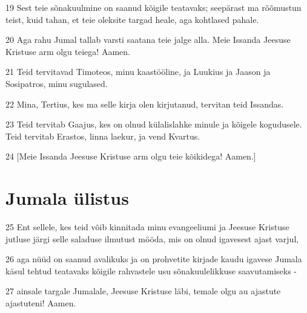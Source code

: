 \par 19 Sest teie sõnakuulmine on saanud kõigile teatavaks; seepärast ma rõõmustun teist, kuid tahan, et teie oleksite targad heale, aga kohtlased pahale.
\par 20 Aga rahu Jumal tallab varsti saatana teie jalge alla. Meie Issanda Jeesuse Kristuse arm olgu teiega! Aamen.
\par 21 Teid tervitavad Timoteos, minu kaastööline, ja Luukius ja Jaason ja Sosipatros, minu sugulased.
\par 22 Mina, Tertius, kes ma selle kirja olen kirjutanud, tervitan teid Issandas.
\par 23 Teid tervitab Gaajus, kes on olnud külalislahke minule ja kõigele kogudusele. Teid tervitab Erastos, linna laekur, ja vend Kvartus.
\par 24 [Meie Issanda Jeesuse Kristuse arm olgu teie kõikidega! Aamen.]

\section*{Jumala ülistus}

\par 25 Ent sellele, kes teid võib kinnitada minu evangeeliumi ja Jeesuse Kristuse jutluse järgi selle saladuse ilmutust mööda, mis on olnud igavesest ajast varjul,
\par 26 aga nüüd on saanud avalikuks ja on prohvetite kirjade kaudu igavese Jumala käsul tehtud teatavaks kõigile rahvastele usu sõnakuulelikkuse saavutamiseks -
\par 27 ainsale targale Jumalale, Jeesuse Kristuse läbi, temale olgu au ajastute ajastuteni! Aamen.





